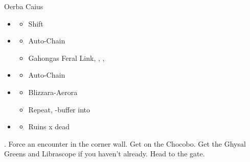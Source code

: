 

\begin{battle}{Oerba Caius}
	\begin{itemize}
		\item \sixth
		      \begin{itemize}
			      \item Shift
		      \end{itemize}
		\item \second
		      \begin{itemize}
			      \item Auto-Chain
			      \item Gahongas Feral Link, \circlec, \squarec, \circlec
		      \end{itemize}
		\item \third
		      \begin{itemize}
			      \item Auto-Chain
		      \end{itemize}
		\item \fifth
		      \begin{itemize}
			      \item Blizzara-Aerora
			      \item Repeat, \com-buffer into
		      \end{itemize}
		\item \first
		      \begin{itemize}
			      \item Ruins x dead
		      \end{itemize}
	\end{itemize}
\end{battle}

. Force an encounter in the corner wall. Get on the Chocobo. Get the Ghysal Greens and Librascope if you haven't already.  Head to the gate.
\newline